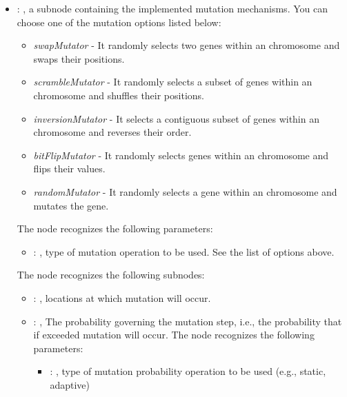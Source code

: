 \begin{itemize}
\begin{itemize}
\begin{itemize}
            \item {}: ,
              a subnode containing the implemented mutation mechanisms. You can choose one of the
              mutation options listed below:                 \begin{itemize}                   \item
              \textit{swapMutator} - It randomly selects two genes within an chromosome and swaps
              their positions.                   \item \textit{scrambleMutator} - It randomly
              selects a subset of genes within an chromosome and shuffles their positions.
              \item \textit{inversionMutator} - It selects a contiguous subset of genes within an
              chromosome and reverses their order.                   \item \textit{bitFlipMutator} -
              It randomly selects genes within an chromosome and flips their values.
              \item \textit{randomMutator} - It randomly selects a gene within an chromosome and
              mutates the gene.                 \end{itemize}
              The  node recognizes the following parameters:
                \begin{itemize}
                  \item {}: ,
                    type of mutation operation to be used. See the list of options above.
              \end{itemize}

              The  node recognizes the following subnodes:
              \begin{itemize}
                \item {}: ,
                  locations at which mutation will occur.

                \item {}: ,
                  The probability governing the mutation step, i.e., the probability that if
                  exceeded mutation will occur.
                  The  node recognizes the following parameters:
                    \begin{itemize}
                      \item {}: ,
                        type of mutation probability operation to be used (e.g., static, adaptive)
                  \end{itemize}
              \end{itemize}
          \end{itemize}


\end{itemize}
\end{itemize}
